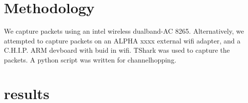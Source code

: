 \documentclass{article}
\begin{document}
\section{Methodology}

We capture packets using an intel wireless dualband-AC 8265. Alternatively, we attempted to capture packets on an ALPHA xxxx external wifi adapter, and a C.H.I.P. ARM devboard with buid in wifi.
TShark was used to capture the packets. A python script was written for channelhopping.


\section{results}

\printbibliography
\end{document}
